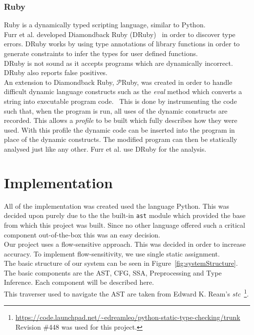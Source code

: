 \documentclass[12pt, titlepage]{article}
\begin{document}
\subsubsection{Ruby}
Ruby is a dynamically typed scripting language, similar to Python. \\
Furr et al. developed Diamondback Ruby (DRuby)~\cite{furr09} in order to discover type errors. DRuby works by using type annotations of library functions in order to generate constraints to infer the types for user defined functions. \\
DRuby is not sound as it accepts programs which are dynamically incorrect. DRuby also reports false positives. \\
An extension to Diamondback Ruby, $\mathcal{P}$Ruby, was created in order to handle difficult dynamic language constructs such as the \textit{eval} method which converts a string into executable program code.~\cite{pRuby} This is done by instrumenting the code such that, when the program is run, all uses of the dynamic constructs are recorded. This allows a \textit{profile} to be built which fully describes how they were used. With this profile the dynamic code can be inserted into the program in place of the dynamic constructs. The modified program can then be statically analysed just like any other. Furr et al. use DRuby for the analysis.











\newpage
\section{Implementation}
All of the implementation was created used the language Python. This was decided upon purely due to the the built-in \texttt{ast} module which provided the base from which this project was built. Since no other language offered such a critical component out-of-the-box this was an easy decision. \\
\indent Our project uses a flow-sensitive approach. This was decided in order to increase accuracy. To implement flow-sensitivity, we use single static assignment. \\
\indent The basic structure of our system can be seen in Figure~\ref{fig:systemStructure}. The basic components are the AST, CFG, SSA, Preprocessing and Type Inference. Each component will be described here. \\
This traverser used to navigate the AST are taken from Edward K. Ream's \textit{stc}~\footnote{\url{https://code.launchpad.net/~edreamleo/python-static-type-checking/trunk} Revision \#448 was used for this project.}. \\
\end{document}
